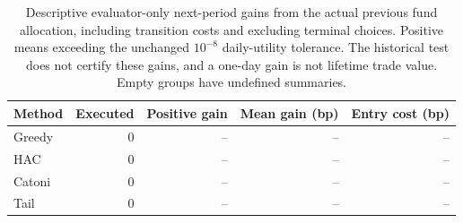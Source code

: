\documentclass[11pt,a4paper]{article}
\theoremstyle{remark}\newtheorem{remark}[theorem]{Remark}
\begin{document}
\begin{table}[H]\centering\small

\begin{tabular}{lrrrr}\toprule

Method & Executed & Positive gain & Mean gain (bp) & Entry cost (bp) \\\midrule

Greedy & 0 & -- & -- & -- \\

HAC & 0 & -- & -- & -- \\

Catoni & 0 & -- & -- & -- \\

Tail & 0 & -- & -- & -- \\

\bottomrule\end{tabular}

\caption{Descriptive evaluator-only next-period gains from the actual previous fund allocation, including transition costs and excluding terminal choices. Positive means exceeding the unchanged $10^{-8}$ daily-utility tolerance. The historical test does not certify these gains, and a one-day gain is not lifetime trade value. Empty groups have undefined summaries.}\label{tab:final-deployments}\end{table}
\end{document}
